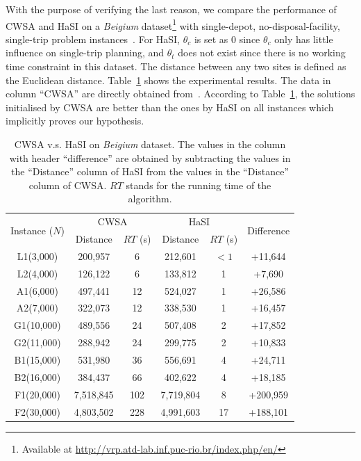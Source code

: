 \documentclass[journal]{IEEEtran}
\begin{document}
With the purpose of verifying the last reason, we compare the performance of CWSA and HaSI on a \emph{Beigium} dataset\footnote{Available at \url{http://vrp.atd-lab.inf.puc-rio.br/index.php/en/}} with single-depot, no-disposal-facility, single-trip problem instances~\cite{arnold2019efficiently}. For HaSI, $\theta_c$ is set as $0$ since $\theta_c$ only has little influence on single-trip planning, and $\theta_t$ does not exist since there is no working time constraint in this dataset. The distance between any two sites is defined as the Euclidean distance. Table~\ref{tab:beigium} shows the experimental results. The data in column ``CWSA'' are directly obtained from~\cite{arnold2019efficiently}. According to Table~\ref{tab:beigium}, the solutions initialised by CWSA are better than the ones by HaSI on all instances which implicitly proves our hypothesis.
\begin{table}[htbp]
	\centering
	\caption{\label{tab:beigium}
		CWSA v.s. HaSI on \emph{Beigium} dataset. The values in the column with header ``difference'' are obtained by subtracting the values in the ``Distance'' column of HaSI from the values in the ``Distance'' column of CWSA. $RT$ stands for the running time of the algorithm.
	}
	\setlength{\tabcolsep}{5pt}
	\begin{tabular}{|c|cc|cc|c|}
		\hline
		\multirow{2}{*}{Instance ($N$)} & \multicolumn{2}{c|}{CWSA} & \multicolumn{2}{c|}{HaSI} & \multirow{2}{*}{Difference}\\
		& Distance & $RT$ (s) &  Distance & $RT$ (s) & \\
		\hline
		L1(3,000) & 200,957 & 6 & 212,601 & $<1$ & +11,644 \\
		L2(4,000) & 126,122 & 6 & 133,812& 1  & +7,690 \\
		A1(6,000) & 497,441 & 12 & 524,027 & 1 & +26,586\\
		A2(7,000) & 322,073 & 12 & 338,530 & 1 & +16,457 \\
		G1(10,000) & 489,556 & 24 & 507,408 & 2 & +17,852 \\
		G2(11,000) & 288,942 & 24 & 299,775 & 2 & +10,833\\
		B1(15,000) & 531,980 & 36 & 556,691 & 4 & +24,711 \\
		B2(16,000) & 384,437 & 66 & 402,622 & 4 & +18,185 \\
		F1(20,000) & 7,518,845 & 102 & 7,719,804 & 8 & +200,959\\
		F2(30,000) & 4,803,502 & 228 & 4,991,603 & 17 & +188,101 \\
		\hline
	\end{tabular}
\end{table}
\end{document}
